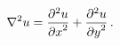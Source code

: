 \[\nabla^{2}u=\frac{{\partial}^{2}u}{{\partial x}^{2}}+\frac{{\partial}^{2}u}{{%
\partial y}^{2}}\,.\]